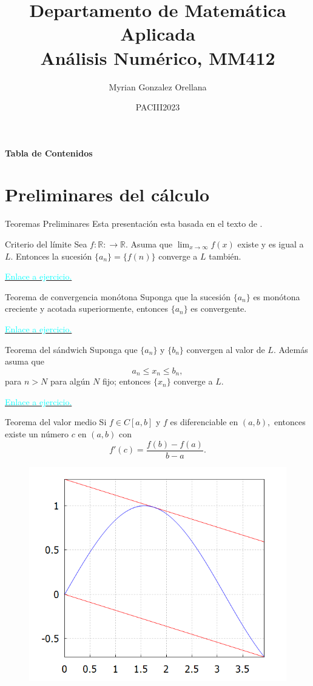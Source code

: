 \documentclass[10pt,legalpaper]{beamer}
\author{Myrian Gonzalez Orellana}
\title{Departamento de Matemática Aplicada\\
Análisis Numérico, MM412}
\institute{UNAH}
\date{PACIII2023}
\begin{document}
\begin{frame}
\titlepage
\end{frame}
\begin{frame}{\centering\textbf{Tabla de Contenidos}}
\tableofcontents[hideallsubsections]
\end{frame}
\section{Preliminares del cálculo}
\begin{frame}[allowframebreaks]{Teoremas Preliminares}
Esta presentación esta basada en el texto de \cite{burden2017análisis}.
\label{RetornoTeoremaPreliminares}
\begin{block}{Criterio del límite}
Sea $f:\mathbb{R}:\rightarrow \mathbb{R}$. Asuma que $\lim_{x\rightarrow \infty}f(x)$ existe y es igual a $L$. Entonces la sucesión $\{a_n\}=\{f(n)\}$ converge a $L$ también.  
\end{block}
\hyperlink{CriterioLimite}{\textcolor{cyan}{Enlace a ejercicio.}}
\begin{block}{Teorema de convergencia monótona}
Suponga que la sucesión $\{a_n\}$ es monótona creciente y acotada superiormente, entonces $\{a_n\}$ es convergente.
\end{block}
\hyperlink{ConvergenciaMonotona}{\textcolor{cyan}{Enlace a ejercicio.}}
\begin{block}{Teorema del sándwich}
Suponga que $\{a_n\}$ y $\{b_n\}$ convergen al valor de $L$. Además asuma que
$$a_n\leq x_n\leq b_n,$$
para $n>N$ para algún $N$ fijo; entonces $\{x_n\}$ converge a $L$.
\end{block}
\hyperlink{Sandwich}{\textcolor{cyan}{Enlace a ejercicio.}}
\framebreak
\begin{block}{Teorema del valor medio}
Si $f\in C[a,b]$ y $f$ es diferenciable en $(a,b),$ entonces existe un número $c$ en $(a,b)$ con
$$f'(c)=\dfrac{f(b)-f(a)}{b-a}.$$
\end{block}
\begin{figure}[H]
\begin{center}
\includegraphics[scale=0.5]{Imagen17}

\end{center}
\end{figure}
\end{frame}
\end{document}
